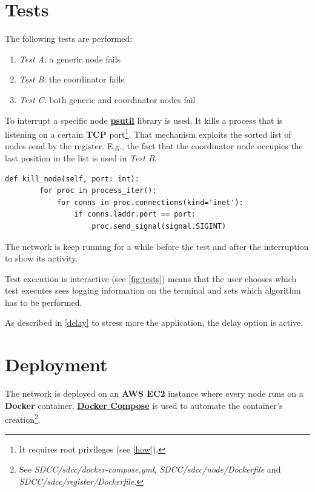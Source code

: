 \documentclass[conference]{IEEEtran}
\begin{document}
\section{Tests}\label{sec:tests}

The following tests are performed:

\begin{enumerate}
    \item \textit{Test A}: a generic node fails
    \item \textit{Test B}: the coordinator fails
    \item \textit{Test C}: both generic and coordinator nodes fail
\end{enumerate}

To interrupt a specific node \href{https://pypi.org/project/psutil/}{\textbf{psutil}} library is used. It kills a process that is listening on a certain \textbf{TCP} port\footnote{It requires root privileges (see \ref{how}).}. That mechanism exploits the sorted list of nodes send by the register. E.g., the fact that the coordinator node occupies the last position in the list is used in \textit{Test B}. 

\begin{lstlisting}
def kill_node(self, port: int):
        for proc in process_iter():
            for conns in proc.connections(kind='inet'):
                if conns.laddr.port == port:
                    proc.send_signal(signal.SIGINT)
\end{lstlisting}

The network is keep running for a while before the test and after the interruption to show its activity.

Test execution is interactive (see \ref{fig:tests}) means that the user chooses which test executes sees logging information on the terminal and sets which algorithm has to be performed.

As described in \ref{delay} to stress more the application, the delay option is active.

\section{Deployment}

The network is deployed on an \textbf{AWS EC2} instance where every node runs on a \textbf{Docker} container. 
\href{https://docs.docker.com/compose/}{\textbf{Docker Compose}} is used to automate the container's creation\footnote{See \textit{SDCC/sdcc/docker-compose.yml},  \textit{SDCC/sdcc/node/Dockerfile} and \textit{SDCC/sdcc/register/Dockerfile}.}. 
\end{document}
